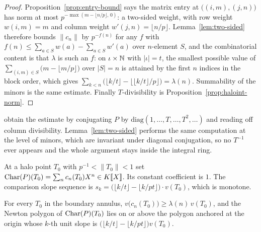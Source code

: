 \begin{proof}
  \leanok
  Proposition~\ref{prop:entry-bound} says the matrix entry at $\bigl((i,m),(j,n)\bigr)$ has norm
  at most $p^{-\max(m-\lfloor n/p\rfloor,\,0)}$: a two-sided weight, with row weight
  $w(i,m) = m$ and column weight $w'(j,n) = \lfloor n/p\rfloor$.  Lemma~\ref{lem:two-sided}
  therefore bounds $\lVert c_n\rVert$ by $p^{-f(n)}$ for any $f$ with
  $f(n)\leq \sum_{a\in S}w(a) - \sum_{a\in S}w'(a)$ over $n$-element $S$, and the combinatorial
  content is that $\lambda$ is such an $f$: on $\iota\times\mathbb{N}$ with $\lvert\iota\rvert = t$, the
  smallest possible value of $\sum_{(i,m)\in S}\bigl(m - \lfloor m/p\rfloor\bigr)$ over
  $\lvert S\rvert = n$ is attained by the first $n$ indices in the block order, which gives
  $\sum_{k<n}\bigl(\lfloor k/t\rfloor - \lfloor \lfloor k/t\rfloor/p\rfloor\bigr) = \lambda(n)$.
  Summability of the minors is the same estimate.  Finally $T$-divisibility is
  Proposition~\ref{prop:haloint-norm}.
\end{proof}

\cite{LWX} obtain the estimate by conjugating $P$ by $\mathrm{diag}(1,\dots,T,\dots,T^2,\dots)$
and reading off column divisibility.  Lemma~\ref{lem:two-sided} performs the same computation at
the level of minors, which are invariant under diagonal conjugation, so no $T^{-1}$ ever appears
and the whole argument stays inside the integral ring.

\begin{definition}
  \label{def:speccharseries}
  \leanok
  At a halo point $T_0$ with $p^{-1}<\lVert T_0\rVert<1$ set
  $\operatorname{Char}(P)(T_0) = \sum_n c_n(T_0)X^n \in K\llbracket X\rrbracket$.  Its constant coefficient is
  $1$.  The comparison slope sequence is
  $s_k = \bigl(\lfloor k/t\rfloor - \lfloor k/pt\rfloor\bigr)\cdot v(T_0)$, which is monotone.
\end{definition}

\begin{theorem}
  \label{thm:lwx318}
  \leanok
  For every $T_0$ in the boundary annulus, $v\bigl(c_n(T_0)\bigr) \geq \lambda(n)\,v(T_0)$, and
  the Newton polygon of $\operatorname{Char}(P)(T_0)$ lies on or above the polygon anchored at the origin
  whose $k$-th unit slope is $\bigl(\lfloor k/t\rfloor - \lfloor k/pt\rfloor\bigr)v(T_0)$.
\end{theorem}

